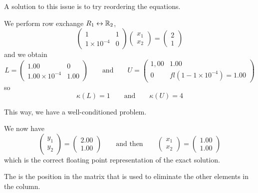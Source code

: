 A solution to this issue is to try reordering the equations.

\begin{example}[Cont.]
    We perform row exchange \( R_1 \leftrightarrow \mathbb{R}_2 \), \[
        \begin{pmatrix}
            1 & 1 \\ 1 \times 10^{-4} & 0
        \end{pmatrix} \begin{pmatrix}
            x_1 \\ x_2
        \end{pmatrix} = \begin{pmatrix}
            2 \\ 1
        \end{pmatrix}
    \] and we obtain \[
        L = \begin{pmatrix}
            1.00 & 0 \\ 1.00 \times 10^{-4} & 1.00
        \end{pmatrix}
        \qquad \text{and} \qquad
        U = \begin{pmatrix}
            1,00 & 1.00 \\ 0 & fl(1 - 1 \times 10^{-4}) = 1.00
        \end{pmatrix}
    \] so \[
        \kappa(L) = 1
        \qquad \text{and} \qquad
        \kappa(U) = 4
    \]

    This way, we have a well-conditioned problem.

    We now have \[
        \begin{pmatrix}
            y_1 \\ y_2
        \end{pmatrix} = \begin{pmatrix}
            2.00 \\ 1.00
        \end{pmatrix}
        \qquad \text{and then} \qquad
        \begin{pmatrix}
            x_1 \\ x_2
        \end{pmatrix} = \begin{pmatrix}
            1.00 \\ 1.00
        \end{pmatrix}
    \] which is the correct floating point representation of the exact solution.
\end{example}

\begin{definition}
    The  is the position in the matrix that is used to eliminate the other elements in the column.
\end{definition}

